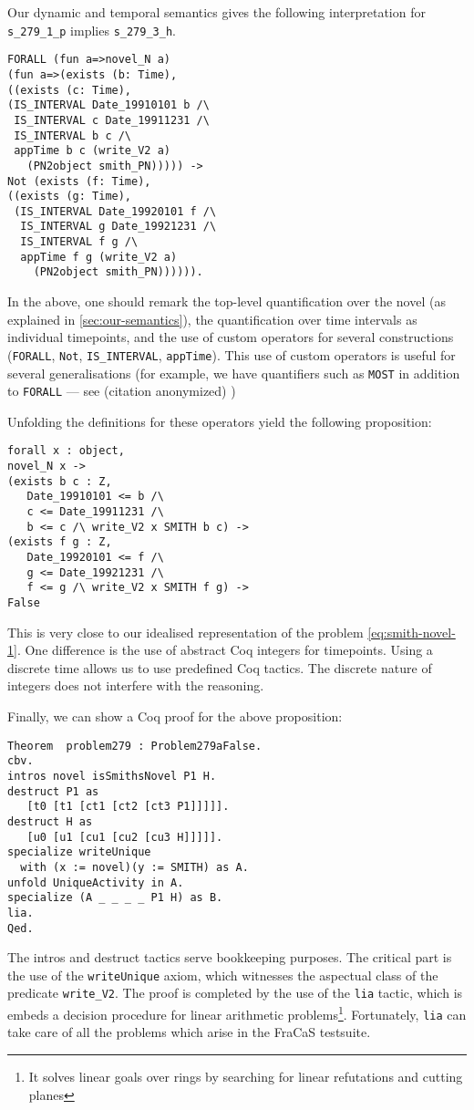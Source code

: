 \documentclass[11pt,a4paper]{article}
\begin{document}
Our dynamic and temporal semantics gives the following interpretation
for \verb!s_279_1_p! implies \verb!s_279_3_h!.
{\small
\begin{verbatim}
FORALL (fun a=>novel_N a)
(fun a=>(exists (b: Time),
((exists (c: Time),
(IS_INTERVAL Date_19910101 b /\
 IS_INTERVAL c Date_19911231 /\
 IS_INTERVAL b c /\
 appTime b c (write_V2 a)
   (PN2object smith_PN))))) ->
Not (exists (f: Time),
((exists (g: Time),
 (IS_INTERVAL Date_19920101 f /\
  IS_INTERVAL g Date_19921231 /\
  IS_INTERVAL f g /\
  appTime f g (write_V2 a) 
    (PN2object smith_PN)))))).
\end{verbatim}
}
In the above, one should remark the top-level quantification over the
novel (as explained in \cref{sec:our-semantics}), the quantification
over time intervals as individual timepoints, and the use of custom
operators for several constructions (\verb!FORALL!, \verb!Not!, \verb!IS_INTERVAL!,
\verb!appTime!). This use of custom operators is useful for several
generalisations (for example, we have quantifiers such as \verb!MOST! in
addition to \verb!FORALL! --- see \ifanon (citation anonymized)
\else \citet{bernardy_type-theoretical_2017} \fi)

Unfolding the definitions for these operators yield the following
proposition:
{\small
\begin{verbatim}
forall x : object,
novel_N x ->
(exists b c : Z,
   Date_19910101 <= b /\
   c <= Date_19911231 /\
   b <= c /\ write_V2 x SMITH b c) ->
(exists f g : Z,
   Date_19920101 <= f /\
   g <= Date_19921231 /\
   f <= g /\ write_V2 x SMITH f g) ->
False
\end{verbatim}
}This is very close to our idealised representation of the problem
\cref{eq:smith-novel-1}. One difference is the use of abstract Coq
integers for timepoints. Using a discrete time allows us to use
predefined Coq tactics. The discrete nature of integers does not
interfere with the reasoning.

Finally, we can show a Coq proof for the above proposition:
{\small
\begin{verbatim}
Theorem  problem279 : Problem279aFalse.
cbv.
intros novel isSmithsNovel P1 H.
destruct P1 as
   [t0 [t1 [ct1 [ct2 [ct3 P1]]]]].
destruct H as
   [u0 [u1 [cu1 [cu2 [cu3 H]]]]].
specialize writeUnique
  with (x := novel)(y := SMITH) as A.
unfold UniqueActivity in A.
specialize (A _ _ _ _ P1 H) as B.
lia.
Qed.
\end{verbatim}
}

The intros and destruct tactics serve bookkeeping purposes. The
critical part is the use of the \texttt{writeUnique} axiom, which
witnesses the aspectual class of the predicate \texttt{write\_V2}.
The proof is completed by the use of the \texttt{lia} tactic, which is
embeds a decision procedure for linear arithmetic problems\footnote{It
  solves linear goals over rings by searching for linear refutations
  and cutting planes}. Fortunately, \texttt{lia} can take care of all
the problems which arise in the FraCaS testsuite.
\end{document}
